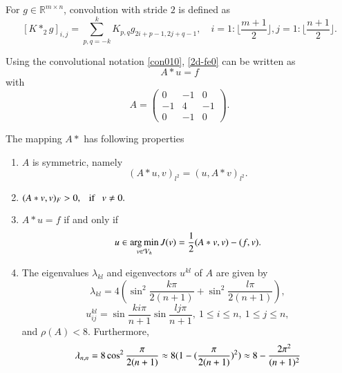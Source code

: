 \begin{definition}\label{def:convolution2}
For $g \in \mathbb{R}^{m\times n}$, convolution with stride $2$ is defined as 
\begin{equation}\label{stride_2}
[K \ast_2 g]_{i,j} = \sum_{p,q=-k}^k K_{p,q} g_{2i + p-1, 2j + q-1},  
\quad i = 1: \lfloor \frac{m+1}{2}\rfloor , j = 1: \lfloor \frac{n+1}{2} \rfloor.
\end{equation}
\end{definition}

Using the convolutional notation \eqref{con010}, \eqref{2d-fe0} can be written as 
\begin{equation}
  \label{eq:Ac}
A\ast u=f
\end{equation}
with 
\begin{equation}
  \label{Ac}
A=
\begin{pmatrix}
0&-1&0\\
-1&4&-1\\
0&-1&0
\end{pmatrix}
.
\end{equation}

\begin{proposition}\label{prop:A}
The mapping $A\ast$ has following properties
\begin{enumerate}
\item $A$ is symmetric, namely 
$$
(A\ast u, v)_{l^2}=(u,A\ast v)_{l^2}.
$$
\item  $(A\ast v, v)_F>0, ~~~\hbox{if}~~~v\neq 0.$
\item $A\ast u=f$ if and only if 
\begin{equation}\label{minProblem}
u\in \operatorname*{arg\,min}_{v\in \mathcal V_h} J(v)={1\over 2}(A\ast v,v)-(f,v).
\end{equation}
\item The eigenvalues $\lambda_{kl}$ and eigenvectors $u^{kl}$ of $A$ are given by
$$
\lambda_{kl}=4(\sin^2\frac{k\pi}{2(n+1)}+ \sin^2\frac{l\pi}{2(n+1)}),
$$
$$
u_{ij}^{kl}=\sin \frac{ki\pi}{n+1}\sin \frac{lj\pi}{n+1},\ 1\leq i\leq n,\ 1\leq j\leq n,
$$
and  $\rho(A)<8$. Furthermore,
\begin{equation*}
\lambda_{n,n}=8\cos^2\frac{\pi}{2(n+1)}\approx 8(1- ({\pi\over 2(n+1)})^2) \approx 8-{2\pi^2\over (n+1)^2}
\end{equation*}
\end{enumerate}
\end{proposition}


  




